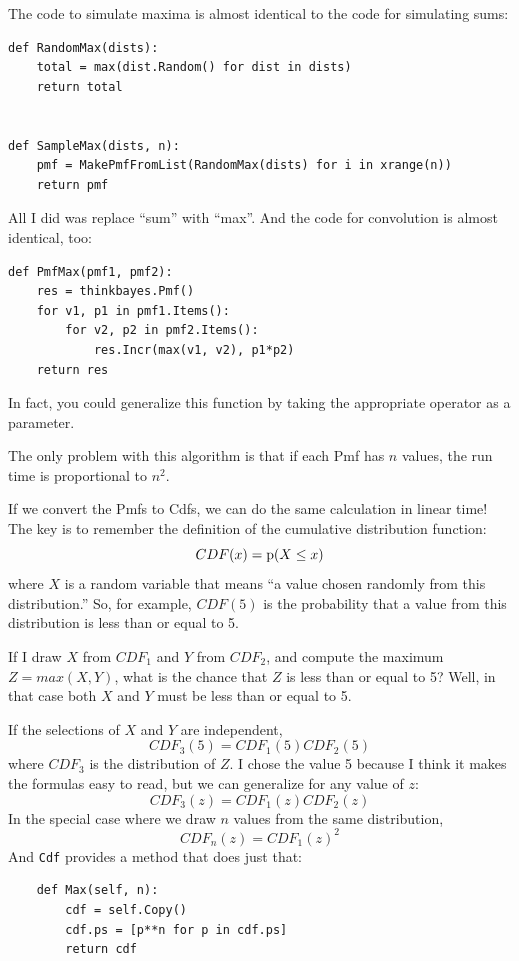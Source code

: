 \documentclass[12pt]{book}
\begin{document}
The code to simulate maxima is almost identical to the code for
simulating sums:

\begin{verbatim}
def RandomMax(dists):
    total = max(dist.Random() for dist in dists)
    return total


def SampleMax(dists, n):
    pmf = MakePmfFromList(RandomMax(dists) for i in xrange(n))
    return pmf
\end{verbatim}

All I did was replace ``sum'' with ``max''.  And the code
for convolution is almost identical, too:

\begin{verbatim}
def PmfMax(pmf1, pmf2):
    res = thinkbayes.Pmf()
    for v1, p1 in pmf1.Items():
        for v2, p2 in pmf2.Items():
            res.Incr(max(v1, v2), p1*p2)
    return res
\end{verbatim}

In fact, you could generalize this function by taking the
appropriate operator as a parameter.

The only problem with this algorithm is that if each Pmf
has $n$ values, the run time is proportional to $n^2$.

If we convert the Pmfs to Cdfs, we can do the same calculation
in linear time!  The key is to remember the definition of the
cumulative distribution function:
%
\[ CDF(x) = \mathrm{p}(X \le x) \]
%
where $X$ is a random variable that means ``a value chosen
randomly from this distribution.''  So, for example, $CDF(5)$
is the probability that a value from this distribution is less
than or equal to 5.

If I draw $X$ from $CDF_1$ and $Y$ from $CDF_2$, and compute
the maximum $Z = max(X, Y)$, what is the chance that $Z$ is
less than or equal to 5?  Well, in that case both $X$ and $Y$
must be less than or equal to 5.

If the selections of $X$ and $Y$ are independent,
%
\[ CDF_3(5) = CDF_1(5) CDF_2(5) \] 
%
where $CDF_3$ is the distribution of $Z$.  I chose the value
5 because I think it makes the formulas easy to read, but we
can generalize for any value of $z$:
%
\[ CDF_3(z) = CDF_1(z) CDF_2(z) \]
%
In the special case where we draw $n$ values from the same
distribution, 
%
\[ CDF_n(z) = CDF_1(z)^2 \]
%
And \verb"Cdf" provides a method that does just that:

\begin{verbatim}
    def Max(self, n):
        cdf = self.Copy()
        cdf.ps = [p**n for p in cdf.ps]
        return cdf
\end{verbatim}
\end{document}
